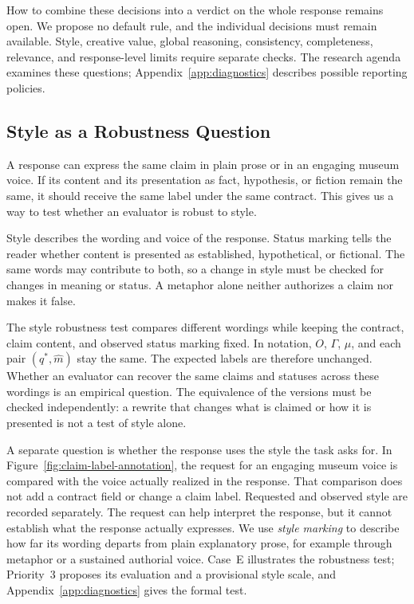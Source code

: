 \documentclass{clv2025}
\begin{document}
How to combine these decisions into a verdict on the whole response remains
open. We propose no default rule, and the individual decisions must remain
available. Style, creative value, global reasoning, consistency, completeness,
relevance, and response-level limits require separate checks. The research
agenda examines these questions; Appendix~\ref{app:diagnostics} describes
possible reporting policies.

\subsection{Style as a Robustness Question}\label{subsec:style}

A response can express the same claim in plain prose or in an engaging
museum voice. If its content and its presentation as fact, hypothesis, or
fiction remain the same, it should receive the same label under the same
contract. This gives us a way to test whether an evaluator is robust to style.

Style describes the wording and voice of the response. Status marking tells
the reader whether content is presented as established, hypothetical, or
fictional. The same words may contribute to both, so a change in style must
be checked for changes in meaning or status. A metaphor alone neither
authorizes a claim nor makes it false.

The style robustness test compares different wordings while keeping the contract, claim
content, and observed status marking fixed. In notation, $O$, $\Gamma$,
$\mu$, and each pair $(q^*,\widehat{m})$ stay the same. The expected labels
are therefore unchanged. Whether an evaluator can recover the same claims
and statuses across these wordings is an empirical question. The equivalence
of the versions must be checked independently: a rewrite that changes what
is claimed or how it is presented is not a test of style alone.

A separate question is whether the response uses the style the task asks
for. In Figure~\ref{fig:claim-label-annotation}, the request for an engaging
museum voice is compared with the voice actually realized in the response.
That comparison does not add a contract field or change a claim label. Requested and observed style are recorded separately. The request can
help interpret the response, but it cannot establish what the response
actually expresses. We use \emph{style marking} to describe how far its
wording departs from plain explanatory prose, for example through metaphor
or a sustained authorial voice. Case~E illustrates the robustness test;
Priority~3 proposes its evaluation and a provisional style scale, and
Appendix~\ref{app:diagnostics} gives the formal test.
\end{document}
